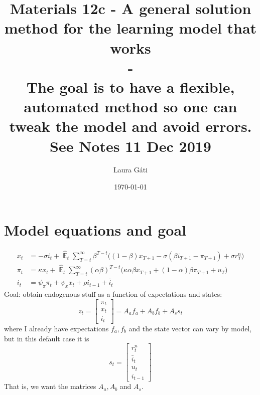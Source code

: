 \documentclass[11pt]{article}
\renewcommand{\[}{\begin{equation}}
\renewcommand{\]}{\end{equation}}
\DeclareMathOperator{\E}{\mathbb{E}}
\begin{document}
\linespread{1.0}

\title{Materials 12c - A general solution method for the learning model that works \\
- 
\\
\small{The goal is to have a flexible, automated method so one can tweak the model and avoid errors. \\See Notes 11 Dec 2019}}
\author{Laura G\'ati} 
\date{\today}
\maketitle




\section{Model equations and goal}
\begin{align}
x_t &=  -\sigma i_t +\hat{\E}_t \sum_{T=t}^{\infty} \beta^{T-t }\big( (1-\beta)x_{T+1} - \sigma(\beta i_{T+1} - \pi_{T+1}) +\sigma r_T^n \big)  \label{prestons18}  \\
\pi_t &= \kappa x_t +\hat{\E}_t \sum_{T=t}^{\infty} (\alpha\beta)^{T-t }\big( \kappa \alpha \beta x_{T+1} + (1-\alpha)\beta \pi_{T+1} + u_T\big) \label{prestons19}  \\
i_t &= \psi_{\pi}\pi_t + \psi_{x} x_t  + \rho i_{t-1} + \bar{i}_t \label{TR}
\end{align}
Goal: obtain endogenous stuff as a function of expectations and states:
\begin{equation}
z_t = \begin{bmatrix} \pi_t \\ x_t \\ i_t \end{bmatrix} = A_a f_{a} + A_b f_{b} + A_s s_t
\end{equation}
where I already have expectations $f_a, f_b$ and the state vector can vary by model, but in this default case it is \begin{equation}
s_t = \begin{bmatrix} r_t^n \\ \bar{i}_t \\ u_t \\ i_{t-1} \end{bmatrix}
\end{equation}
That is,  we want the matrices $A_a, A_b$ and $A_s$.
\end{document}
